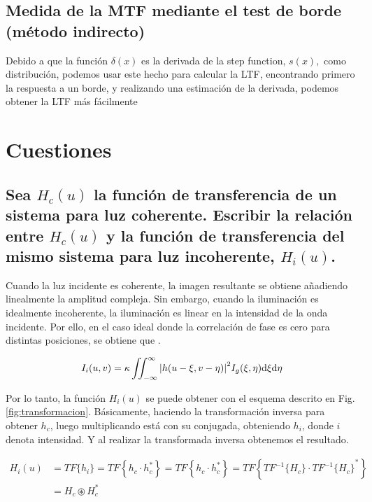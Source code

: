 \documentclass{./packages/optica-article}
\newcommand\conv{\circledast}
\begin{document}
\subsection{Medida de la MTF mediante el test de borde (método indirecto)}\label{sec:resultados:indirecto}

Debido a que la función $\delta(x)$ es la derivada de la step function, $s(x),$ como distribución, podemos usar este hecho para calcular la LTF, encontrando primero la respuesta a un borde, y realizando una estimación de la derivada, podemos obtener la LTF más fácilmente

\section{Cuestiones}

\subsection{Sea $H_{c}(u)$ la función de transferencia de un sistema para luz coherente. Escribir la relación entre $H_{c}(u)$ y la función de transferencia del mismo sistema para luz incoherente, $H_{i}(u)$.}

Cuando la luz incidente es coherente, la imagen resultante se obtiene añadiendo linealmente la amplitud compleja. Sin embargo, cuando la iluminación es idealmente incoherente, la iluminación es linear en la intensidad de la onda incidente. Por ello, en el caso ideal donde la correlación de fase es cero para distintas posiciones, se obtiene que \cite[p.~132--134]{goodman1996introduction}.

\begin{equation}
	I_{i}(u,v) = \kappa \iint_{-\infty}^{\infty}\abs{h(u - \xi, v- \eta)}^{2} I_{g}(\xi, \eta) \dd \xi \dd \eta
\end{equation}

Por lo tanto, la función $H_{i}(u)$ se puede obtener con el esquema descrito en Fig. \ref{fig:transformacion}. Básicamente, haciendo la transformación inversa para obtener $h_{c}$, luego multiplicando está con su conjugada, obteniendo $h_{i}$, donde $i$ denota intensidad. Y al realizar la transformada inversa obtenemos el resultado.

\begin{align}
	H_{i}(u)
	 & = TF\{h_i\}
	= TF\left\{ h_{c} \cdot h^{*}_{c}\right\}
	= TF\left\{ h_{c} \cdot h^{*}_{c}\right\}
	= TF\left\{ TF^{-1}\{H_{c}\} \cdot {TF^{-1}\{H_{c}\}}^{*}\right\}
	\\
	 & = H_{c} \conv H^{*}_{c}
\end{align}
\end{document}
